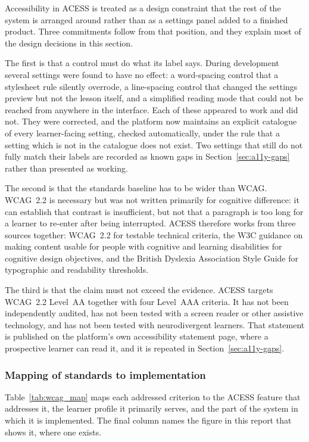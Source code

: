 \documentclass[12pt, oneside]{article} %
\begin{document}
Accessibility in ACESS is treated as a design constraint that the rest of the system is arranged around rather than as a settings panel added to a finished product. Three commitments follow from that position, and they explain most of the design decisions in this section.

The first is that a control must do what its label says. During development several settings were found to have no effect: a word-spacing control that a stylesheet rule silently overrode, a line-spacing control that changed the settings preview but not the lesson itself, and a simplified reading mode that could not be reached from anywhere in the interface. Each of these appeared to work and did not. They were corrected, and the platform now maintains an explicit catalogue of every learner-facing setting, checked automatically, under the rule that a setting which is not in the catalogue does not exist. Two settings that still do not fully match their labels are recorded as known gaps in Section~\ref{sec:a11y-gaps} rather than presented as working.

The second is that the standards baseline has to be wider than WCAG. WCAG~2.2 is necessary but was not written primarily for cognitive difference: it can establish that contrast is insufficient, but not that a paragraph is too long for a learner to re-enter after being interrupted. ACESS therefore works from three sources together: WCAG~2.2 \cite{wcag22} for testable technical criteria, the W3C guidance on making content usable for people with cognitive and learning disabilities \cite{wcag_cognitive} for cognitive design objectives, and the British Dyslexia Association Style Guide \cite{bda_style_guide} for typographic and readability thresholds.

The third is that the claim must not exceed the evidence. ACESS targets WCAG~2.2 Level~AA together with four Level~AAA criteria. It has not been independently audited, has not been tested with a screen reader or other assistive technology, and has not been tested with neurodivergent learners. That statement is published on the platform's own accessibility statement page, where a prospective learner can read it, and it is repeated in Section~\ref{sec:a11y-gaps}.

\subsubsection{Mapping of standards to implementation}

Table~\ref{tab:wcag_map} maps each addressed criterion to the ACESS feature that addresses it, the learner profile it primarily serves, and the part of the system in which it is implemented. The final column names the figure in this report that shows it, where one exists.
\end{document}
